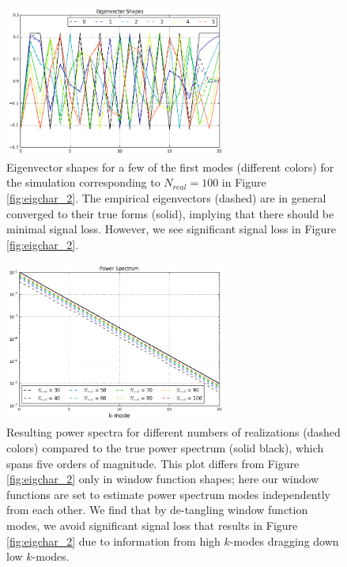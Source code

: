 \begin{figure}
    \centering
	\includegraphics[width=0.65\textwidth]{plots/eigchar_3.png}    
	\caption{Eigenvector shapes for a few of the first modes (different colors) for the simulation corresponding to $N_{real}=100$ in Figure \ref{fig:eigchar_2}. The empirical eigenvectors (dashed) are in general converged to their true forms (solid), implying that there should be minimal signal loss. However, we see significant signal loss in Figure \ref{fig:eigchar_2}.}
    \label{fig:eigchar_3}
\end{figure}

\begin{figure}
    \centering
	\includegraphics[width=0.65\textwidth]{plots/eigchar_4.png}    
	\caption{Resulting power spectra for different numbers of realizations (dashed colors) compared to the true power spectrum (solid black), which spans five orders of magnitude. This plot differs from Figure \ref{fig:eigchar_2} only in window function shapes; here our window functions are set to estimate power spectrum modes independently from each other. We find that by de-tangling window function modes, we avoid significant signal loss that results in Figure \ref{fig:eigchar_2} due to information from high $k$-modes dragging down low $k$-modes.}
    \label{fig:eigchar_4}
\end{figure}

